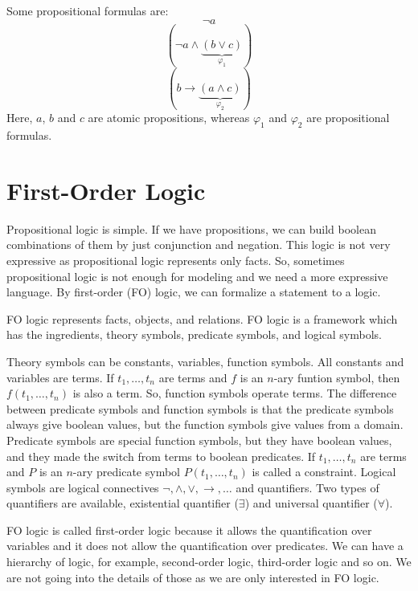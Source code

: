 \begin{example}
	Some propositional formulas are:
	$$\neg \mathit{a}$$
	$$ ( \neg \mathit{a} \wedge \underbrace{ ( \mathit{b} \vee \mathit{c} ) }\limits_{\mathit{\varphi_{1}}} ) $$
	$$ ( \mathit{b} \to \underbrace{ ( \mathit{a} \wedge \mathit{c} ) }\limits_{\mathit{\varphi_{2}}} ) $$
	Here,  $\mathit{a}$, $\mathit{b}$ and $\mathit{c}$ are atomic propositions, whereas $\mathit{\varphi_{1}}$ and $\mathit{\varphi_{2}}$ are propositional formulas.
\end{example}
\section{First-Order Logic}
\label{sec:FOLogic}
Propositional logic is simple. 
If we have propositions, we can build boolean combinations of them by just conjunction and negation.
This logic is not very expressive as propositional logic represents only facts.
So, sometimes propositional logic is not enough for modeling and we need a more expressive language.
By first-order (FO) logic, we can formalize a statement to a logic.\newline

\noindent FO logic represents facts, objects, and relations.
FO logic is a framework which has the ingredients, theory symbols, predicate symbols, and logical symbols.\newline

\noindent Theory symbols can be constants, variables, function symbols.
All constants and variables are terms.
If $t_{1}, \ldots, t_{n}$ are terms and $f$ is an $n$-ary funtion symbol, then $f(t_{1}, \ldots, t_{n})$ is also a term.
So, function symbols operate terms.
The difference between predicate symbols and function symbols is that the predicate symbols always give boolean values, but the function symbols give values from a domain.
Predicate symbols are special function symbols, but they have boolean values, and they made the switch from terms to boolean predicates.
If $t_{1}, \ldots, t_{n}$ are terms and $P$ is an $n$-ary predicate symbol $P(t_{1}, \ldots, t_{n})$ is called a constraint.
Logical symbols are logical connectives $\neg, \wedge, \vee, \to, \ldots$ and quantifiers.
Two types of quantifiers are available, existential quantifier ($\exists$) and universal quantifier ($\forall$).\newline

\noindent FO logic is called first-order logic because it allows the quantification over variables and it does not allow the quantification over predicates.
We can have a hierarchy of logic, for example, second-order logic, third-order logic and so on.
We are not going into the details of those as we are only interested in FO logic.\newline

